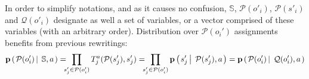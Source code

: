 In order to simplify notations, and as it causes no confusion, $\mathbb{S}$, $\mathcal{P}(o'_i)$, 
$\mathcal{P}(s'_i)$ and $\mathcal{Q}(o'_i)$ designate as well a set of variables, 
or a vector comprised of these variables (with an arbitrary order).
Distribution over $\mathcal{P}(o_i')$ assignments benefits from previous rewritings:
\begin{eqnarray}
\textbf{p} \paren{ \mathcal{P}(o_i') \sachant \mathbb{S},a} =  \hspace{-0.2cm} \prod_{s'_j \in \mathcal{P}(o_i')} T_j^a(\mathcal{P}(s'_j), s'_j) = \hspace{-0.2cm} \prod_{ s'_j \in \mathcal{P}(o_i')} \textbf{p} \paren{ s_j' \sachant \mathcal{P}(s_j'),a }
\label{distribPOP} =  \textbf{p} \paren{ \mathcal{P}(o_i') \sachant \mathcal{Q}(o_i') ,a}
\end{eqnarray} 
